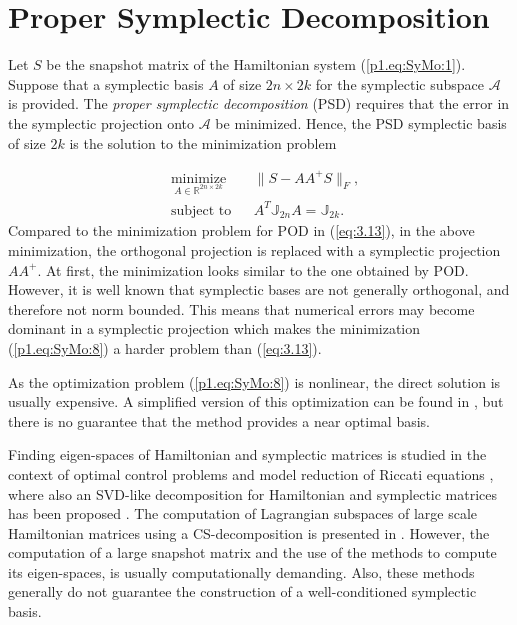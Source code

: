 \section{Proper Symplectic Decomposition} \label{p1.sec:SyMo.PrSy:1}

Let $S$ be the snapshot matrix of the Hamiltonian system (\ref{p1.eq:SyMo:1}). Suppose that a symplectic basis $A$ of size $2n\times2k$ for the symplectic subspace $\mathcal A$ is provided. The \emph{proper symplectic decomposition} (PSD) requires that the error in the symplectic projection onto $\mathcal A$ be minimized. Hence, the PSD symplectic basis of size $2k$ is the solution to the minimization problem

\begin{equation} \label{p1.eq:SyMo:8}
\begin{aligned}
& \underset{A\in \mathbb R^{2n\times 2k}}{\text{minimize}}
& & \| S - AA^+S\|_F, \\
& \text{subject to}
& & A^T \mathbb{J}_{2n}A = \mathbb{J}_{2k}.
\end{aligned}
\end{equation}
Compared to the minimization problem for POD in (\ref{eq:3.13}), in the above minimization, the orthogonal projection is replaced with a symplectic projection $AA^+$. At first, the minimization looks similar to the one obtained by POD. However, it is well known that symplectic bases are not generally orthogonal, and therefore not norm bounded. This means that numerical errors may become dominant in a symplectic projection \cite{doi:10.1137/050628519} which makes the minimization (\ref{p1.eq:SyMo:8}) a harder problem than (\ref{eq:3.13}).
	
As the optimization problem (\ref{p1.eq:SyMo:8}) is nonlinear, the direct solution is usually expensive. A simplified version of this optimization can be found in \cite{doi:10.1137/140978922}, but there is no guarantee that the method provides a near optimal basis.

Finding eigen-spaces of Hamiltonian and symplectic matrices is studied in the context of optimal control problems \cite{Benner:2000ww,benner1997new,watkins2004hamiltonian,bunse1986matrix} and model reduction of Riccati equations \cite{benner1997new}, where also an SVD-like decomposition for Hamiltonian and symplectic matrices has been proposed \cite{xu2003svd}. The computation of Lagrangian subspaces of large scale Hamiltonian matrices using a CS-decomposition is presented in \cite{mehrmann2016inverse,doi:10.1137/110850773}. However, the computation of a large snapshot matrix and the use of the methods to compute its eigen-spaces, is usually computationally demanding. Also, these methods generally do not guarantee the construction of a well-conditioned symplectic basis.

